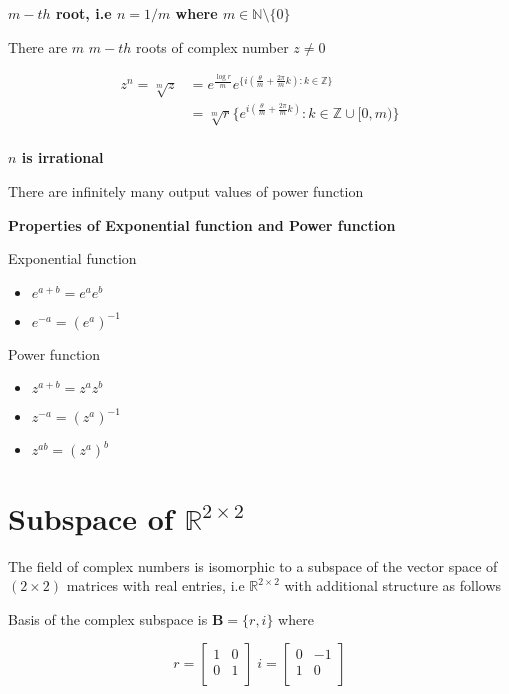 \documentclass{article}
\begin{document}
\textbf{$m-th$ root, i.e $n = 1/m$ where $m \in \mathbb{N} \setminus \{0\}$}

There are $m$ $m-th$ roots of complex number $z \neq 0$

\begin{align*}
    z^n = \sqrt[m]{z}&= e^{\frac{\log r}{m}} e^ {\{ i (\frac{\theta}{m} + \frac{2 \pi}{m} k): k \in \mathbb{Z} \}} \\
        &= \sqrt[m]{r} \{ e^ {i (\frac{\theta}{m} + \frac{2 \pi}{m} k)}: k \in \mathbb{Z} \cup [0, m) \} \\ 
\end{align*}

\textbf{$n$ is irrational}

There are infinitely many output values of power function


\textbf{Properties of Exponential function and Power function}

Exponential function
\begin{itemize}
    \item $e^{a + b} = e^{a} e^{b}$
    \item $e^{-a} = (e^{a})^{-1}$
\end{itemize}

Power function
\begin{itemize}
    \item $z^{a + b} = z^{a} z^{b}$
    \item $z^{-a} = (z^{a})^{-1}$
    \item $z^{ab} = (z^a)^b$
\end{itemize}



\section{Subspace of $\mathbb{R}^{2 \times 2}$}

The field of complex numbers is isomorphic to a subspace of the vector space of $(2 \times 2)$ matrices with real entries, i.e $\mathbb{R}^{2 \times 2}$ with additional structure as follows

Basis of the complex subspace is $\mathbf{B} = \{r, i\}$ where

$$
    r = \begin{bmatrix}
        1 & 0 \\
        0 & 1 \\
    \end{bmatrix}
    \;
    i = \begin{bmatrix}
        0 & -1 \\
        1 & 0 \\
    \end{bmatrix}
$$
\end{document}
